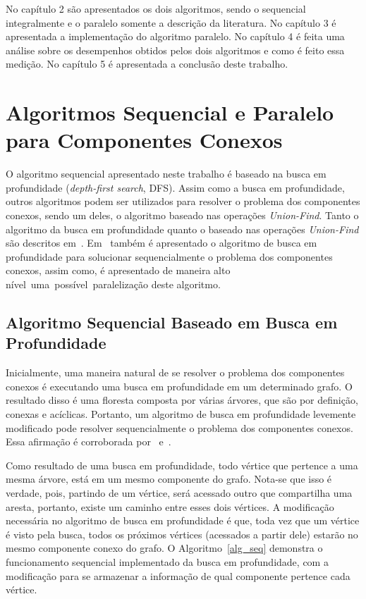 \documentclass[12pt]{article}
\begin{document}
No capítulo 2 são apresentados os dois algoritmos, sendo o sequencial integralmente e o paralelo somente a descrição da literatura. No capítulo 3 é apresentada a implementação do algoritmo paralelo. No capítulo 4 é feita uma análise sobre os desempenhos obtidos pelos dois algoritmos e como é feito essa medição. No capítulo 5 é apresentada a conclusão deste trabalho.

\section{Algoritmos Sequencial e Paralelo para Componentes Conexos}
O algoritmo sequencial apresentado neste trabalho é baseado na busca em profundidade (\emph{depth-first search}, DFS). Assim como a busca em profundidade, outros algoritmos podem ser utilizados para resolver o problema dos componentes conexos, sendo um deles, o algoritmo baseado nas operações \emph{Union-Find}. Tanto o algoritmo da busca em profundidade quanto o baseado nas operações \emph{Union-Find} são descritos em~\cite{Sedgewick:2011}. Em~\cite{Grama:2003} também é apresentado o algoritmo de busca em profundidade para solucionar sequencialmente o problema dos componentes conexos, assim como, é apresentado de maneira alto nível uma possível paralelização deste algoritmo.

\subsection{Algoritmo Sequencial Baseado em Busca em Profundidade}

Inicialmente, uma maneira natural de se resolver o problema dos componentes conexos é executando uma busca em profundidade em um determinado grafo. O resultado disso é uma floresta composta por várias árvores, que são por definição, conexas e acíclicas. Portanto, um algoritmo de busca em profundidade levemente modificado pode resolver sequencialmente o problema dos componentes conexos. Essa afirmação é corroborada por~\cite{Grama:2003} e~\cite{Sedgewick:2011}.

Como resultado de uma busca em profundidade, todo vértice que pertence a uma mesma árvore, está em um mesmo componente do grafo. Nota-se que isso é verdade, pois, partindo de um vértice, será acessado outro que compartilha uma aresta, portanto, existe um caminho entre esses dois vértices. A modificação necessária no algoritmo de busca em profundidade é que, toda vez que um vértice é visto pela busca, todos os próximos vértices (acessados a partir dele) estarão no mesmo componente conexo do grafo. O Algoritmo~\ref{alg_seq} demonstra o funcionamento sequencial implementado da busca em profundidade, com a modificação para se armazenar a informação de qual componente pertence cada vértice.
\end{document}
